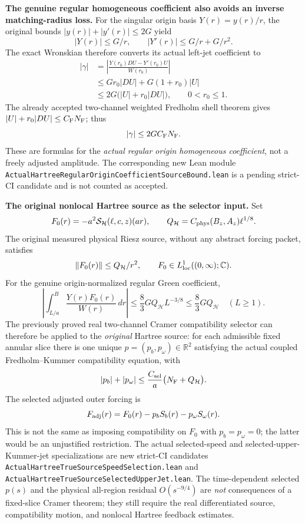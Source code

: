 \documentclass[11pt]{amsart}
\newcommand{\C}{\mathbb C}
\newcommand{\R}{\mathbb R}
\newcommand{\HH}{\mathcal H}
\begin{document}
\medskip
\noindent\textbf{The genuine regular homogeneous coefficient also avoids
an inverse matching-radius loss.}
For the singular origin basis $Y(r)=y(r)/r$, the original bounds
$|y(r)|+|y'(r)|\le 2G$ yield
\[
 |Y(r)|\le G/r,\qquad
 |Y'(r)|\le G/r+G/r^2.
\]
The exact Wronskian therefore converts its actual left-jet coefficient to
\begin{align*}
 |\gamma|
 &=\left|\frac{Y(r_0)DU-Y'(r_0)U}{W(r_0)}\right|\\
 &\le Gr_0|DU|+G(1+r_0)|U|\\
 &\le 2G\bigl(|U|+r_0|DU|\bigr),
 \qquad 0<r_0\le1.
\end{align*}
The already accepted two-channel weighted Fredholm shell theorem gives
$|U|+r_0|DU|\le C_{\rm F}N_{\rm F}$; thus
\[
 |\gamma|\le 2GC_{\rm F}N_{\rm F}.
\]
These are formulas for the \emph{actual regular origin homogeneous
coefficient}, not a freely adjusted amplitude.  The corresponding
new Lean module
\texttt{ActualHartreeRegularOriginCoefficientSourceBound.lean}
is a pending strict-CI candidate and is not counted as accepted.

\medskip
\noindent\textbf{The original nonlocal Hartree source as the selector input.}
Set
\[
 F_0(r)=-a^2\mathcal S_{\HH}(\ell,c,z)(ar),\qquad
 Q_{\HH}=C_{\rm phys}(B_z,A_z)\ell^{1/8}.
\]
The original measured physical Riesz source, without any abstract
forcing packet, satisfies
\[
 \|F_0(r)\|\le Q_{\HH}/r^2,\qquad
 F_0\in L^1_{\rm loc}((0,\infty);\C).
\]
For the genuine origin-normalized regular Green coefficient,
\[
 \left|\int_{L/a}^B\frac{Y(r)F_0(r)}{W(r)}\,dr\right|
 \le\frac83 GQ_{\HH}L^{-3/8}
 \le\frac83GQ_{\HH}\quad(L\ge1).
\]
The previously proved real two-channel Cramer compatibility selector
can therefore be applied to the \emph{original} Hartree source:
for each admissible fixed annular slice there is one unique
$p=(p_b,p_\omega)\in\R^2$ satisfying the actual coupled
Fredholm--Kummer compatibility equation, with
\[
 |p_b|+|p_\omega|
 \le\frac{C_{\rm sel}}a
 \bigl(N_{\rm F}+Q_{\HH}\bigr).
\]
The selected adjusted outer forcing is
\[
 F_{\rm adj}(r)=F_0(r)-p_bS_b(r)-p_\omega S_\omega(r).
\]
This is not the same as imposing compatibility on $F_0$ with
$p_b=p_\omega=0$; the latter would be an unjustified restriction.
The actual selected-speed and selected-upper-Kummer-jet
specializations are new strict-CI candidates
\texttt{ActualHartreeTrueSourceSpeedSelection.lean} and
\texttt{ActualHartreeTrueSourceSelectedUpperJet.lean}.
The time-dependent selected $p(s)$ and the physical all-region
residual $O(s^{-9/4})$ are \emph{not} consequences of a fixed-slice
Cramer theorem; they still require the real differentiated source,
compatibility motion, and nonlocal Hartree feedback estimates.
\end{document}
